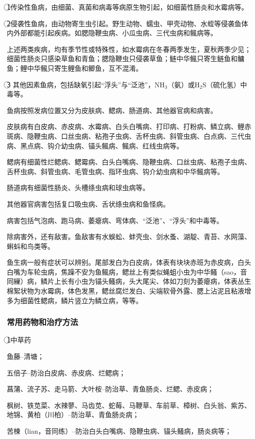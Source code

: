 \documentclass{ctexbook}
\begin{document}
\textcircled{1}传染性鱼病，由细菌、真菌和病毒等病原生物引起，如细菌性肠炎和水霉病等。

\textcircled{2}侵袭性鱼病，由动物寄生虫引起。野生动物、蠕虫、甲壳动物、水蛭等侵袭鱼体内外部都能引起疾病。如腮隐鞭虫病、小瓜虫病、三代虫病和鲺病等。

上述两类疾病，均有季节性或特殊性，如水霉病在冬春两季发生，夏秋两季少见；细菌性肠炎只感染草鱼和青鱼；腮隐鞭虫只侵袭草鱼；鲢中华鲺只寄生鲢鱼和鳙鱼；鲤中华鲺只寄生鲤鱼和鲫鱼，互不混淆。

\textcircled{3}
其他因素鱼病，包括缺氧引起“浮头”与“泛池”，NH$_3$（氨）或H$_2$S（硫化氢）中毒等。

鱼病按照发病位置又分为皮肤病、鳃病、肠道病、其他器官病和病害。

皮肤病有白皮病、赤皮病、水霉病、白头白嘴病、打印病、打粉病、鳞立病、鲤赤斑病、隐鞭虫病、口丝虫病、粘孢子虫病、舌杯虫病、斜管虫病、白点病、三代虫病、黑点病、钩介幼虫病、锚头鲺病、鲺病、红线虫病等。

鳃病有细菌性烂鳃病、鳃霉病、白头白嘴病、隐鞭虫病、口丝虫病、粘孢子虫病、舌杯虫病、斜管虫病、毛管虫病、指环虫病、钩介幼虫病和中华鲺病等。

肠道病有细菌性肠炎、头槽绦虫病和球虫病等。

其他器官病害包括复口吸虫病、舌状绦虫病和鱼怪病。

病害包括气泡病、跑马病、萎瘪病、弯体病、“泛池”、“浮头”和中毒等。

除病害外，还有敌害。鱼敌害有水蜈蚣、蚌壳虫、剑水蚤、湖靛、青苔、水网藻、蝌蚪和鸟类等。

鱼生病一般有症状可以辨别。尾部发白为白皮病，体表有块块赤班为赤皮病，白头白嘴为车轮虫病，焦躁不安为鱼鲺病，鳃丝上有类似蝇蛆小虫为中华鳋（sao，音同繅）病，鳞片上长有小虫为锚头鳋病，头大尾尖、体如刀刻为萎瘪病，体表丛生棉絮状物为水霉病，体色发黑，鳃丝腐烂发白、尖端软骨外露、腮上沾泥且粘液增多为细菌性鳃病，鳞片竖立为鳞立病，等等。
\subsubsection{常用药物和治疗方法}
\textcircled{1}中草药

鱼藤--清塘；

五倍子--防治白皮病、赤皮病、烂鳃病；

菖蒲、流子苏、走马箭、大叶桉--防治草、青鱼肠炎、烂鳃、赤皮病；

枫树、铁苋菜、水辣蓼、马齿苋、蛇莓、马鞭草、车前草、樟树、白头翁、紫苏、地锦、黄柏（川柏）--防治草、青鱼肠炎病；

苦楝（lian，音同练）--防治白头白嘴病、隐鞭虫病、锚头鳋病，肠炎病等；
\end{document}
